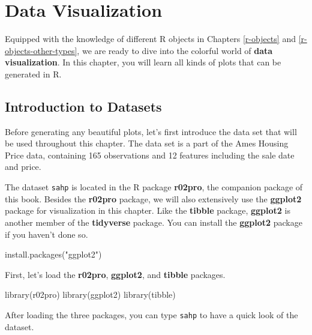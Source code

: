 \documentclass[
]{book}
\newenvironment{Shaded}{\begin{snugshade}}{\end{snugshade}}
\newcommand{\FunctionTok}[1]{\textcolor[rgb]{0.00,0.00,0.00}{#1}}
\newcommand{\NormalTok}[1]{#1}
\newcommand{\StringTok}[1]{\textcolor[rgb]{0.31,0.60,0.02}{#1}}
\begin{document}
\hypertarget{data-visualization}{%
\chapter{Data Visualization}\label{data-visualization}}

Equipped with the knowledge of different R objects in Chapters \ref{r-objects} and \ref{r-objects-other-types}, we are ready to dive into the colorful world of \textbf{data visualization}. In this chapter, you will learn all kinds of plots that can be generated in R.

\hypertarget{intro-dataset}{%
\section{Introduction to Datasets}\label{intro-dataset}}

Before generating any beautiful plots, let's first introduce the data set that will be used throughout this chapter. The data set is a part of the Ames Housing Price data, containing 165 observations and 12 features including the sale date and price.

The dataset \texttt{sahp} is located in the R package \textbf{r02pro}, the companion package of this book.
Besides the \textbf{r02pro} package, we will also extensively use the \textbf{ggplot2} package for visualization in this chapter. Like the \textbf{tibble} package, \textbf{ggplot2} is another member of the \textbf{tidyverse} package. You can install the \textbf{ggplot2} package if you haven't done so.

\begin{Shaded}
\begin{Highlighting}[]
\FunctionTok{install.packages}\NormalTok{(}\StringTok{"ggplot2"}\NormalTok{)}
\end{Highlighting}
\end{Shaded}

First, let's load the \textbf{r02pro}, \textbf{ggplot2}, and \textbf{tibble} packages.

\begin{Shaded}
\begin{Highlighting}[]
\FunctionTok{library}\NormalTok{(r02pro)}
\FunctionTok{library}\NormalTok{(ggplot2)}
\FunctionTok{library}\NormalTok{(tibble)}
\end{Highlighting}
\end{Shaded}

After loading the three packages, you can type \texttt{sahp} to have a quick look of the dataset.
\end{document}
